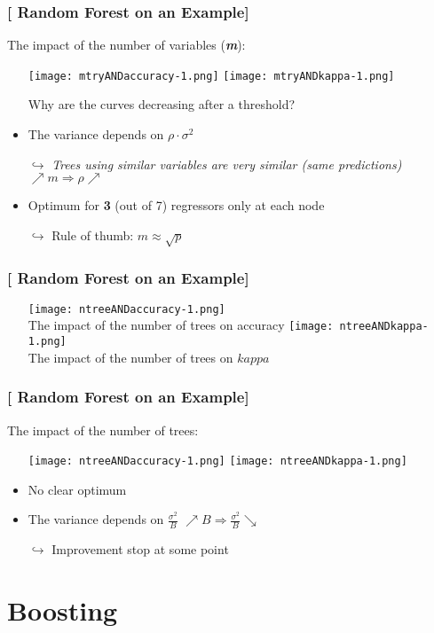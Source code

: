 \documentclass[xcolor=x11names,compress, handhouts]{beamer}
\renewcommand{\(}{\begin{columns}}
\renewcommand{\)}{\end{columns}}
\newcommand{\<}[1]{\begin{column}{#1}}
\renewcommand{\>}{\end{column}}
\begin{document}
\begin{frame}
\frametitle{\textcolor{brique}{[ Random Forest on an Example]}}
The impact of the number of variables (\textbf{\textit{m}}):
\pause
\begin{itemize}[<+->]
    \item[] \texttt{[image: mtryANDaccuracy-1.png]} \texttt{[image: mtryANDkappa-1.png]}
    \item[] Why are the curves decreasing after a threshold?
    \item The variance depends on $\rho \cdot \sigma^{2}$ 
    \item[$\hookrightarrow$] \textit{Trees using similar variables are very similar (same predictions)} \\
    $\nearrow  m \Longrightarrow \rho \nearrow$\\  
    \item Optimum for \textbf{3} (out of 7) regressors only at each node
   \item[$\hookrightarrow$] Rule of thumb: $m \approx \sqrt{p}$ 
\end{itemize}
\end{frame}



\begin{frame}
\frametitle{\textcolor{brique}{[ Random Forest on an Example]}}
\pause
\begin{itemize}
\item[]
    {\texttt{[image: ntreeANDaccuracy-1.png]}\\  }
    {The impact of the number of trees on accuracy}
    {\texttt{[image: ntreeANDkappa-1.png]}\\ }
    {The impact of the number of trees on $kappa$ }
\end{itemize}
\end{frame}


\begin{frame}
\frametitle{\textcolor{brique}{[ Random Forest on an Example]}}
The impact of the number of trees:
\pause
\begin{itemize}[<+->]
    \item[] \texttt{[image: ntreeANDaccuracy-1.png]} \texttt{[image: ntreeANDkappa-1.png]}
    \item No clear optimum
    \item The variance depends on $\frac{\sigma^{2}}{B}$
    $\nearrow  B \Longrightarrow \frac{\sigma^{2}}{B}  \searrow $\\
   \item[$\hookrightarrow$] Improvement stop at some point
\end{itemize}
\end{frame}






\section{Boosting}
\end{document}
